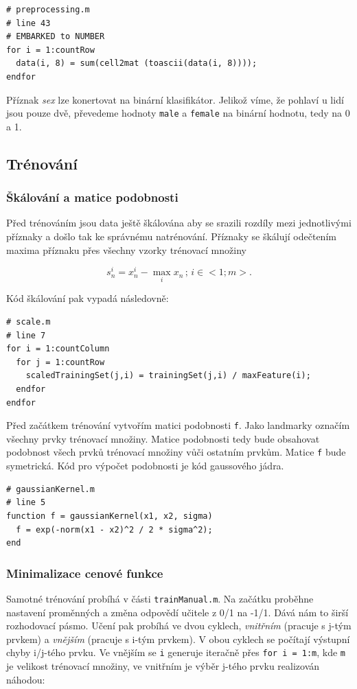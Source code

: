 \documentclass[a4]{article}
\begin{document}
\begin{lstlisting}
# preprocessing.m
# line 43 
# EMBARKED to NUMBER
for i = 1:countRow
  data(i, 8) = sum(cell2mat (toascii(data(i, 8))));
endfor
\end{lstlisting}

\noindent Příznak \textit{sex} lze konertovat na binární klasifikátor. Jelikož víme, že pohlaví u lidí jsou pouze dvě, převedeme hodnoty \texttt{male} a \texttt{female} na binární hodnotu, tedy na 0 a 1.

\subsection{Trénování}
\subsubsection{Škálování a matice podobnosti}
Před trénováním jsou data ještě škálována aby se srazili rozdíly mezi jednotlivými příznaky a došlo tak ke správnému natrénování. Příznaky se škálují odečtením maxima příznaku přes všechny vzorky trénovací množiny

$$
s_{n}^{i} = x_{n}^{i} - \max_{i} x_{n} \,;\, i \in <1;m>.
$$

\noindent Kód škálování pak vypadá následovně:

\begin{lstlisting}
# scale.m
# line 7 
for i = 1:countColumn
  for j = 1:countRow
    scaledTrainingSet(j,i) = trainingSet(j,i) / maxFeature(i);
  endfor
endfor 
\end{lstlisting}

\noindent Před začátkem trénování vytvořím matici podobnosti \texttt{f}. Jako landmarky označím všechny prvky trénovací množiny. Matice podobnosti tedy bude obsahovat podobnost všech prvků trénovací množiny vůči ostatním prvkům. Matice \texttt{f} bude symetrická. Kód pro výpočet podobnosti je kód gaussového jádra.

\begin{lstlisting}
# gaussianKernel.m
# line 5
function f = gaussianKernel(x1, x2, sigma)
  f = exp(-norm(x1 - x2)^2 / 2 * sigma^2); 
end
\end{lstlisting}

\subsubsection{Minimalizace cenové funkce}
Samotné trénování probíhá v části \texttt{trainManual.m}. Na začátku proběhne nastavení proměnných a změna odpovědí učitele z 0/1 na -1/1. Dává nám to širší rozhodovací pásmo. Učení pak probíhá ve dvou cyklech, \textit{vnitřním} (pracuje s j-tým prvkem) a \textit{vnějším} (pracuje s i-tým prvkem). V obou cyklech se počítají výstupní chyby i/j-tého prvku. Ve vnějším se \texttt{i} generuje iteračně přes \texttt{for i = 1:m}, kde \texttt{m} je velikost trénovací množiny, ve vnitřním je výběr j-tého prvku realizován náhodou:
\end{document}
